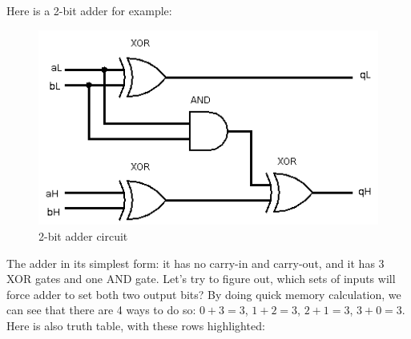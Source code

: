 Here is a 2-bit adder for example:

\begin{figure}[ht!]
\centering
\includegraphics[scale=0.75]{SAT/adder_logisim.png}
\caption{2-bit adder circuit}
\end{figure}

The adder in its simplest form: it has no carry-in and carry-out, and it has 3 XOR gates and one AND gate.
Let's try to figure out, which sets of inputs will force adder to set both two output bits?
By doing quick memory calculation, we can see that there are 4 ways to do so: $0+3=3$, $1+2=3$, $2+1=3$, $3+0=3$.
Here is also truth table, with these rows highlighted:

\newcommand{\HLcell}{\cellcolor{blue!25}}

